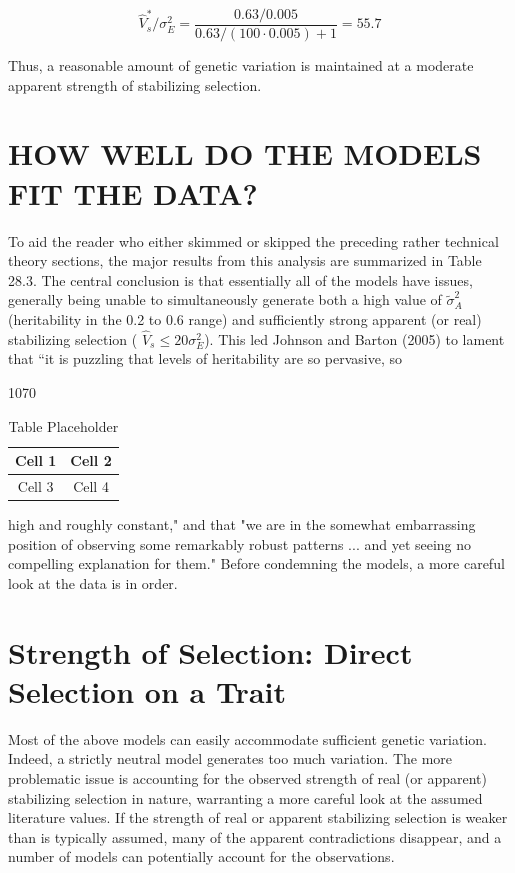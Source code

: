 \documentclass{article}
\begin{document}
\begin{equation}
\widehat{V}_{s}^{*}/\sigma_{E}^{2}=\frac{0.63/0.005}{0.63/(100\cdot0.005)+1}=55.7
\end{equation}

Thus, a reasonable amount of genetic variation is maintained at a moderate apparent strength of stabilizing selection.

\section{HOW WELL DO THE MODELS FIT THE DATA?}
To aid the reader who either skimmed or skipped the preceding rather technical theory sections, the major results from this analysis are summarized in Table 28.3. The central conclusion is that essentially all of the models have issues, generally being unable to simultaneously generate both a high value of  $ \tilde{\sigma}_A^2 $ (heritability in the 0.2 to 0.6 range) and sufficiently strong apparent (or real) stabilizing selection ( $ \widehat{V}_s \leq 20\sigma_E^2 $). This led Johnson and Barton (2005) to lament that “it is puzzling that levels of heritability are so pervasive, so

1070

\begin{table}[h]
\centering
\begin{tabular}{|c|c|}
\hline
Cell 1 & Cell 2 \\
\hline
Cell 3 & Cell 4 \\
\hline
\end{tabular}
\caption{Table Placeholder}
\end{table}

high and roughly constant," and that "we are in the somewhat embarrassing position of observing some remarkably robust patterns ... and yet seeing no compelling explanation for them." Before condemning the models, a more careful look at the data is in order.

\section{Strength of Selection: Direct Selection on a Trait}
Most of the above models can easily accommodate sufficient genetic variation. Indeed, a strictly neutral model generates too much variation. The more problematic issue is accounting for the observed strength of real (or apparent) stabilizing selection in nature, warranting a more careful look at the assumed literature values. If the strength of real or apparent stabilizing selection is weaker than is typically assumed, many of the apparent contradictions disappear, and a number of models can potentially account for the observations.
\end{document}
